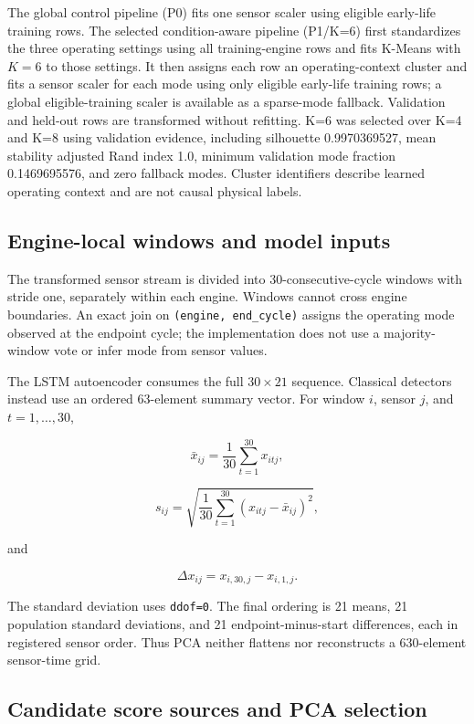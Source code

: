 \documentclass[11pt]{article}
\begin{document}
The global control pipeline (P0) fits one sensor scaler using eligible early-life training rows. The selected condition-aware pipeline (P1/K=6) first standardizes the three operating settings using all training-engine rows and fits K-Means with $K=6$ to those settings. It then assigns each row an operating-context cluster and fits a sensor scaler for each mode using only eligible early-life training rows; a global eligible-training scaler is available as a sparse-mode fallback. Validation and held-out rows are transformed without refitting. K=6 was selected over K=4 and K=8 using validation evidence, including silhouette 0.9970369527, mean stability adjusted Rand index 1.0, minimum validation mode fraction 0.1469695576, and zero fallback modes. Cluster identifiers describe learned operating context and are not causal physical labels.


\subsection{Engine-local windows and model inputs}


The transformed sensor stream is divided into 30-consecutive-cycle windows with stride one, separately within each engine. Windows cannot cross engine boundaries. An exact join on \texttt{(engine, end\_cycle)} assigns the operating mode observed at the endpoint cycle; the implementation does not use a majority-window vote or infer mode from sensor values.


The LSTM autoencoder consumes the full $30\times21$ sequence. Classical detectors instead use an ordered 63-element summary vector. For window $i$, sensor $j$, and $t=1,\ldots,30$,


\[

\bar{x}_{ij}=\frac{1}{30}\sum_{t=1}^{30}x_{itj},
\]


\[

s_{ij}=\sqrt{\frac{1}{30}\sum_{t=1}^{30}\left(x_{itj}-\bar{x}_{ij}\right)^2},
\]


and


\[

\Delta x_{ij}=x_{i,30,j}-x_{i,1,j}.
\]


The standard deviation uses \texttt{ddof=0}. The final ordering is 21 means, 21 population standard deviations, and 21 endpoint-minus-start differences, each in registered sensor order. Thus PCA neither flattens nor reconstructs a 630-element sensor-time grid.


\subsection{Candidate score sources and PCA selection}
\end{document}
